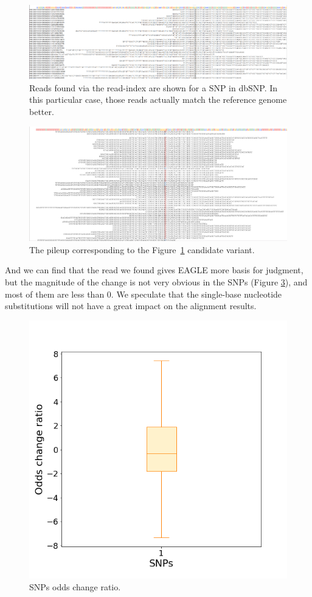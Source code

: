 \begin{figure}[H]
\includegraphics[width=1\columnwidth]{body/image/snp_new_REFread.png}
\caption[SNP worse match reads]{Reads found via the read-index are shown for a SNP in dbSNP.  In this particular case, those reads actually match the reference genome better.}
\label{snp_new_REFread}
\end{figure}

\begin{figure}[H]
\includegraphics[width=1\columnwidth]{body/image/snp_pileup_REFread.png}
\caption[SNP worse match reads pileup]{The pileup corresponding to the Figure~\ref{snp_new_REFread} candidate variant.}
\label{snp_pileup_REFread}
\end{figure}

And we can find that the read we found gives EAGLE more basis for judgment, but the magnitude of the change is not very obvious in the SNPs (Figure \ref{snp_odds_change}), and most of them are less than 0. We speculate that the single-base nucleotide substitutions will not have a great impact on the alignment results.

\begin{figure}[H]
\centering
\includegraphics[width=0.6\columnwidth]{body/image/snp_odds_change.png}
\caption[SNPs odds change ratio]{SNPs odds change ratio.}
\label{snp_odds_change}
\end{figure}

